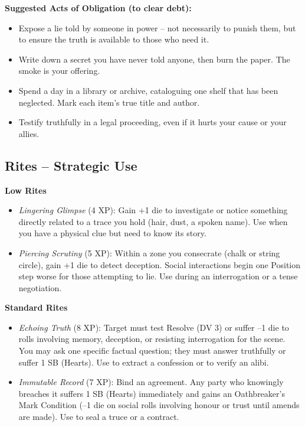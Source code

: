 \documentclass[10pt,a5paper]{book}
\begin{document}
\textbf{Suggested Acts of Obligation (to clear debt):}
\begin{itemize}
    \item Expose a lie told by someone in power – not necessarily to punish them, but to ensure the truth is available to those who need it.
    \item Write down a secret you have never told anyone, then burn the paper. The smoke is your offering.
    \item Spend a day in a library or archive, cataloguing one shelf that has been neglected. Mark each item’s true title and author.
    \item Testify truthfully in a legal proceeding, even if it hurts your cause or your allies.
\end{itemize}

\subsection*{Rites – Strategic Use}

\textbf{Low Rites}
\begin{itemize}
    \item \textit{Lingering Glimpse} (4 XP): Gain +1 die to investigate or notice something directly related to a trace you hold (hair, dust, a spoken name). Use when you have a physical clue but need to know its story.
    \item \textit{Piercing Scrutiny} (5 XP): Within a zone you consecrate (chalk or string circle), gain +1 die to detect deception. Social interactions begin one Position step worse for those attempting to lie. Use during an interrogation or a tense negotiation.
\end{itemize}

\textbf{Standard Rites}
\begin{itemize}
    \item \textit{Echoing Truth} (8 XP): Target must test Resolve (DV 3) or suffer –1 die to rolls involving memory, deception, or resisting interrogation for the scene. You may ask one specific factual question; they must answer truthfully or suffer 1 SB (Hearts). Use to extract a confession or to verify an alibi.
    \item \textit{Immutable Record} (7 XP): Bind an agreement. Any party who knowingly breaches it suffers 1 SB (Hearts) immediately and gains an Oathbreaker’s Mark Condition (–1 die on social rolls involving honour or trust until amends are made). Use to seal a truce or a contract.
\end{itemize}
\end{document}
